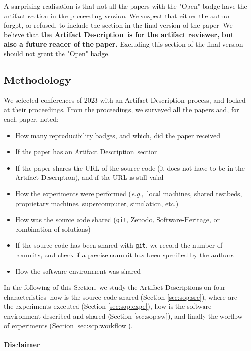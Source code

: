 \documentclass[sigconf,natbib=false]{acmart}
\newcommand{\eg}{\emph{e.g.,}}
\newcommand{\ad}{Artifact Description}
\begin{document}
A surprising realisation is that not all the papers with the "Open" badge have the artifact section in the proceeding version.
We suspect that either the author forgot, or refused, to include the section in the final version of the paper.
We believe that \textbf{the \ad\ is for the artifact reviewer, but also a future reader of the paper.}
Excluding this section of the final version should not grant the "Open" badge.

\subsection{Methodology}

We selected conferences of 2023 with an \ad\ process, and looked at their proceedings.
From the proceedings, we surveyed all the papers and, for each paper, noted:

\begin{itemize}
  \item How many reproducibility badges, and which, did the paper received
  \item If the paper has an \ad\ section
  \item If the paper shares the URL of the source code (it does not have to be in the \ad), and if the URL is still valid
  \item How the experiments were performed (\eg\ local machines, shared testbeds, proprietary machines, supercomputer, simulation, etc.)
  \item How was the source code shared (\texttt{git}, Zenodo, Software-Heritage, or combination of solutions)
  \item If the source code has been shared with \texttt{git}, we record the number of commits, and check if a precise commit has been specified by the authors
  \item How the software environment was shared
\end{itemize}


In the following of this Section, we study the \ad s on four characteristics: how is the source code shared (Section \ref{sec:sop:src}), where are the experiments executed (Section \ref{sec:sop:expe}), how is the software environment described and shared (Section \ref{sec:sop:sw}), and finally the worflow of experiments (Section \ref{sec:sop:workflow}).

\paragraph{Disclaimer}
\end{document}
